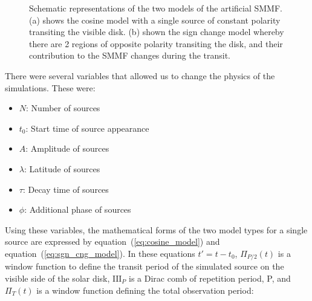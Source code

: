 \begin{figure}
	\centering
	\qquad
	\caption{Schematic representations of the two models of the artificial SMMF. (a) shows the cosine model with a single source of constant polarity transiting the visible disk. (b) shown the sign change model whereby there are 2 regions of opposite polarity transiting the disk, and their contribution to the SMMF changes during the transit.}  \label{fig:artificial_models}
\end{figure}


There were several variables that allowed us to change the physics of the simulations. These were:

\begin{itemize}
	\item{{\bf $N$}: Number of sources}
	\item{{\bf $t_0$}: Start time of source appearance}
	\item{{\bf $A$}: Amplitude of sources}
	\item{{\bf $\lambda$}: Latitude of sources}
	\item{{\bf $\tau$}: Decay time of sources}
	\item{{\bf $\phi$}: Additional phase of sources}
\end{itemize}

Using these variables, the mathematical forms of the two model types for a single source are expressed by equation~(\ref{eq:cosine_model}) and equation~(\ref{eq:sgn_cng_model}). In these equations $t' = t - t_0$, $\Pi_{P/2}(t)$ is a window function to define the transit period of the simulated source on the visible side of the solar disk, $\mathrm{III}_{P}$ is a Dirac comb of repetition period, P, and $\Pi_{T}(t)$ is a window function defining the total observation period:

